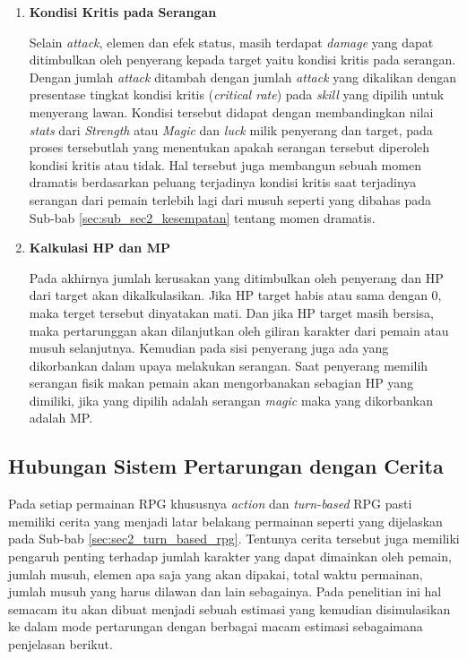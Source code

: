\begin{subs}
\begin{enumerate}[label=\textbf{\arabic*).}]
		\item \textbf{Kondisi Kritis pada Serangan}
		
		Selain \textit{attack}, elemen dan efek status, masih terdapat \textit{damage} yang dapat ditimbulkan oleh penyerang kepada target yaitu kondisi kritis pada serangan. Dengan jumlah \textit{attack} ditambah dengan jumlah \textit{attack} yang dikalikan dengan presentase tingkat kondisi kritis (\textit{critical rate}) pada \textit{skill} yang dipilih untuk menyerang lawan. Kondisi tersebut didapat dengan membandingkan nilai \textit{stats} dari \textit{Strength} atau \textit{Magic} dan \textit{luck} milik penyerang dan target, pada proses tersebutlah yang menentukan apakah serangan tersebut diperoleh kondisi kritis atau tidak. Hal tersebut juga membangun sebuah momen dramatis berdasarkan peluang terjadinya kondisi kritis saat terjadinya serangan dari pemain terlebih lagi dari musuh seperti yang dibahas pada Sub-bab \ref{sec:sub_sec2_kesempatan} tentang momen dramatis.
		\vspace{1ex}
		
		\item \textbf{Kalkulasi HP dan MP}
		
		Pada akhirnya jumlah kerusakan yang ditimbulkan oleh penyerang dan HP dari target akan dikalkulasikan. Jika HP target habis atau sama dengan 0, maka terget tersebut dinyatakan mati. Dan jika HP target masih bersisa, maka pertarunggan akan dilanjutkan oleh giliran karakter dari pemain atau musuh selanjutnya. Kemudian pada sisi penyerang juga ada yang dikorbankan dalam upaya melakukan serangan. Saat penyerang memilih serangan fisik makan pemain akan mengorbanakan sebagian HP yang dimiliki, jika yang dipilih adalah serangan \textit{magic} maka yang dikorbankan adalah MP.
	\end{enumerate}
	
	\subsection{Hubungan Sistem Pertarungan dengan Cerita}
	\label{sec:sub_sec3_story}
	\vspace{1ex}
	
	Pada setiap permainan RPG khususnya \textit{action} dan \textit{turn-based} RPG pasti memiliki cerita yang menjadi latar belakang permainan seperti yang dijelaskan pada Sub-bab \ref{sec:sec2_turn_based_rpg}. Tentunya cerita tersebut juga memiliki pengaruh penting terhadap jumlah karakter yang dapat dimainkan oleh pemain, jumlah musuh, elemen apa saja yang akan dipakai, total waktu permainan, jumlah musuh yang harus dilawan dan lain sebagainya. Pada penelitian ini hal semacam itu akan dibuat menjadi sebuah estimasi yang kemudian disimulasikan ke dalam mode pertarungan dengan berbagai macam estimasi sebagaimana penjelasan berikut.
	\vspace{1ex}
	

\end{subs}
